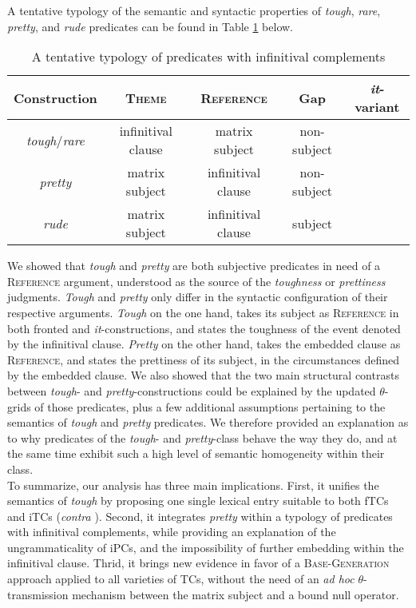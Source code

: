 \documentclass[11pt]{article}
\newcommand{\cmark}{\ding{51}}
\newcommand{\xmark}{\ding{55}}
\begin{document}
	 A tentative typology of the semantic and syntactic properties of \textit{tough}, \textit{rare}, \textit{pretty}, and \textit{rude} predicates can be found in Table \ref{tab:typology} below.
	\begin{table}[H]
		\centering
		\begin{tabular}{|c|c|c|c|c|}
			\hline
			Construction & \textsc{Theme} & \textsc{Reference} & Gap & \textit{it}-variant \\ \hline
			\textit{tough}/\textit{rare} & infinitival clause & matrix subject & non-subject & \cmark \\
			\textit{pretty} & matrix subject & infinitival clause & non-subject & \xmark \\
			\textit{rude} & matrix subject & infinitival clause & subject & \cmark \\ \hline
		\end{tabular}
	\caption{A tentative typology of predicates with infinitival complements}
	\label{tab:typology}
	\end{table}
	We showed that \textit{tough} and \textit{pretty} are both subjective predicates in need of a \textsc{Reference} argument, understood as the source of the \textit{toughness} or \textit{prettiness} judgments.
	\textit{Tough} and \textit{pretty} only differ in the syntactic configuration of their respective arguments. \textit{Tough} on the one hand, takes its subject as \textsc{Reference} in both fronted and \textit{it}-constructions, and states the toughness of the event denoted by the infinitival clause. \textit{Pretty} on the other hand, takes the embedded clause as \textsc{Reference}, and states the prettiness of its subject, in the circumstances defined by the embedded clause. We also showed that the two main structural contrasts between \textit{tough}- and \textit{pretty}-constructions could be explained by the updated $\theta$-grids of those predicates, plus a few additional assumptions pertaining to the semantics of \textit{tough} and \textit{pretty} predicates. We therefore provided an explanation as to why predicates of the \textit{tough}- and \textit{pretty}-class behave the way they do, and at the same time exhibit such a high level of semantic homogeneity within their class.\\
	 To summarize, our analysis has three main implications. First, it unifies the semantics of \textit{tough} by proposing one single lexical entry suitable to both fTCs and iTCs (\textit{contra} \cite{Keine2017}). Second, it integrates \textit{pretty} within a typology of predicates with infinitival complements, while providing an explanation of the ungrammaticality of iPCs, and the impossibility of further embedding within the infinitival clause. Thrid, it brings new evidence in favor of a \textsc{Base-Generation} approach applied to all varieties of TCs, without the need of an \textit{ad hoc} $\theta$-transmission mechanism between the matrix subject and a bound null operator.
\end{document}
